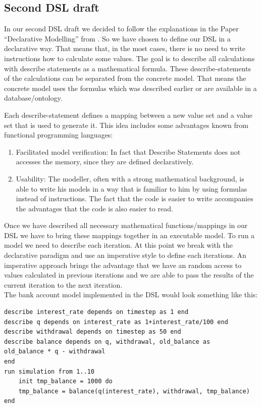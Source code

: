 \subsection{Second DSL draft} \label{sec:second_dsl_draft}
\par
In our second DSL draft we decided to follow the explanations in the Paper ``Declarative Modelling'' from \autocite{dsl:muetzelfeldt}. So we have chosen to define our DSL in a declarative way. That means that, in the most cases, there is no need to write instructions how to calculate some values. The goal is to describe all calculations with describe statements as a mathematical formula. These describe-statements of the calculations can be separated from the concrete model. That means the concrete model uses the formulas which was described earlier or are available in a database/ontology.
\par
Each describe-statement defines a mapping between a new value set and a value set that is used to generate it. This idea includes some advantages known from functional programming languages:
\begin{enumerate}
	\item Facilitated model verification: In fact that Describe Statements does not accesses the memory, since they are defined declaratively.
	\item Usability: The modeller, often with a strong mathematical background, is able to write his models in a way that is familiar to him by using formulas instead of instructions. The fact that the code is easier to write accompanies the advantages that the code is also easier to read.
\end{enumerate}
Once we have described all necessary mathematical functions/mappings in our DSL we have to bring these mappings together in an executable model. To run a model  we need to describe each iteration. At this point we break with the declarative paradigm and use an imperative style to define each iterations. An imperative approach brings the advantage that we have an random access to values calculated in previous iterations and we are able to pass the results of the current iteration to the next iteration. \\
The bank account model implemented in the DSL would look something like this:
\begin{lstlisting}
describe interest_rate depends on timestep as 1 end
describe q depends on interest_rate as 1+interest_rate/100 end
describe withdrawal depends on timestep as 50 end
describe balance depends on q, withdrawal, old_balance as
old_balance * q - withdrawal
end
run simulation from 1..10
    init tmp_balance = 1000 do
	tmp_balance = balance(q(interest_rate), withdrawal, tmp_balance)
end
\end{lstlisting}

